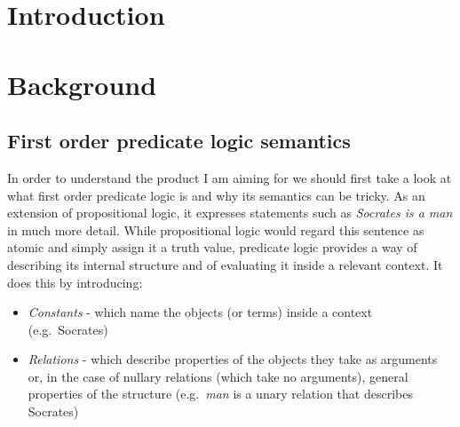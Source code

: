\documentclass{report}
\begin{document}

\chapter{Introduction} %


\chapter{Background} %
\section{First order predicate logic semantics}
In order to understand the product I am aiming for we should first take a look 
at what first order predicate logic is and why its semantics can be tricky. As 
an extension of propositional logic, it expresses statements such as \emph{
Socrates is a man} in much more detail. While propositional logic would regard
this sentence as atomic and simply assign it a truth value, predicate logic
provides a way of describing its internal structure and of evaluating it inside
a relevant context. It does this by introducing:

	\begin{itemize}
	\item \emph{Constants} 
  - which name the objects (or terms) inside a context (e.g.\ Socrates)
	\item \emph{Relations}
  - which describe properties of the objects they take as arguments or, in the
    case of nullary relations (which take no arguments), general properties of
    the structure (e.g.\ \emph{man} is a unary relation that describes Socrates)
	\end{itemize}
\end{document}
